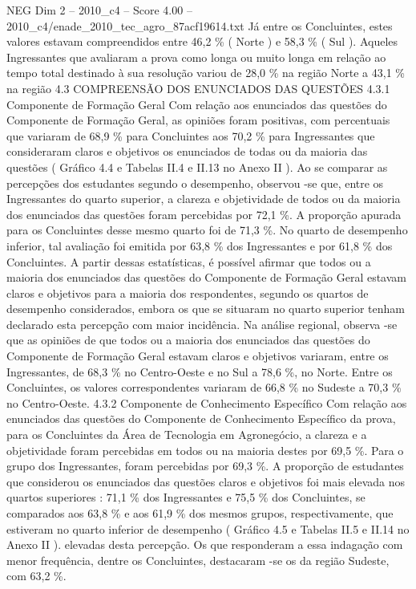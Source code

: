 \begin{textsample}{NEG Dim 2 – 2010\_c4 – Score 4.00 – 2010\_c4/enade\_2010\_tec\_agro\_87acf19614.txt}
Já entre os Concluintes, estes valores estavam compreendidos entre 46,2 \% ( Norte ) e 58,3 \% ( Sul ).
Aqueles Ingressantes que avaliaram a prova como longa ou muito longa em relação ao tempo total destinado à sua resolução variou de 28,0 \% na região Norte a 43,1 \% na região 4.3 COMPREENSÃO DOS ENUNCIADOS DAS QUESTÕES 4.3.1 Componente de Formação Geral Com relação aos enunciados das questões do Componente de Formação Geral, as opiniões foram positivas, com percentuais que variaram de 68,9 \% para Concluintes aos 70,2 \% para Ingressantes que consideraram claros e objetivos os enunciados de todas ou da maioria das questões ( Gráfico 4.4 e Tabelas II.4 e II.13 no Anexo II ).
Ao se comparar as percepções dos estudantes segundo o desempenho, observou -se que, entre os Ingressantes do quarto superior, a clareza e objetividade de todos ou da maioria dos enunciados das questões foram percebidas por 72,1 \%.
A proporção apurada para os Concluintes desse mesmo quarto foi de 71,3 \%.
No quarto de desempenho inferior, tal avaliação foi emitida por 63,8 \% dos Ingressantes e por 61,8 \% dos Concluintes.
A partir dessas estatísticas, é possível afirmar que todos ou a maioria dos enunciados das questões do Componente de Formação Geral estavam claros e objetivos para a maioria dos respondentes, segundo os quartos de desempenho considerados, embora os que se situaram no quarto superior tenham declarado esta percepção com maior incidência.
Na análise regional, observa -se que as opiniões de que todos ou a maioria dos enunciados das questões do Componente de Formação Geral estavam claros e objetivos variaram, entre os Ingressantes, de 68,3 \% no Centro-Oeste e no Sul a 78,6 \%, no Norte.
Entre os Concluintes, os valores correspondentes variaram de 66,8 \% no Sudeste a 70,3 \% no Centro-Oeste. 4.3.2 Componente de Conhecimento Específico Com relação aos enunciados das questões do Componente de Conhecimento Específico da prova, para os Concluintes da Área de Tecnologia em Agronegócio, a clareza e a objetividade foram percebidas em todos ou na maioria destes por 69,5 \%.
Para o grupo dos Ingressantes, foram percebidas por 69,3 \%.
A proporção de estudantes que considerou os enunciados das questões claros e objetivos foi mais elevada nos quartos superiores : 71,1 \% dos Ingressantes e 75,5 \% dos Concluintes, se comparados aos 63,8 \% e aos 61,9 \% dos mesmos grupos, respectivamente, que estiveram no quarto inferior de desempenho ( Gráfico 4.5 e Tabelas II.5 e II.14 no Anexo II ). elevadas desta percepção.
Os que responderam a essa indagação com menor frequência, dentre os Concluintes, destacaram -se os da região Sudeste, com 63,2 \%.

\end{textsample}
